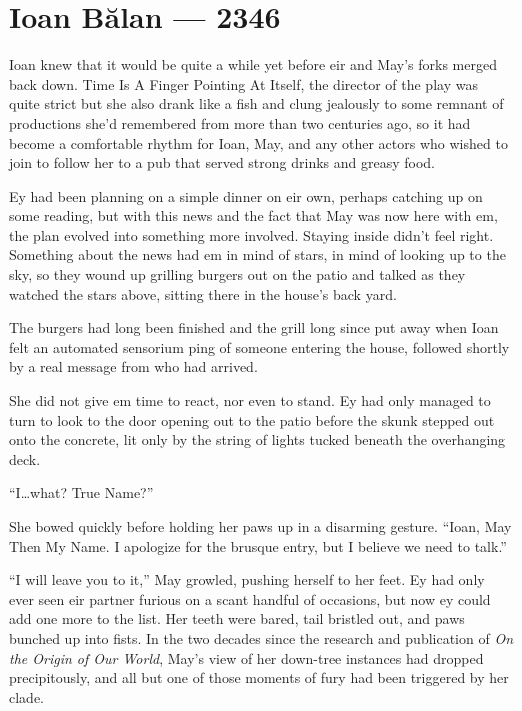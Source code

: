 \hypertarget{ioan-bux103lan-2346}{%
\chapter{Ioan Bălan — 2346}\label{ioan-bux103lan-2346}}

Ioan knew that it would be quite a while yet before eir and May's forks merged back down. Time Is A Finger Pointing At Itself, the director of the play was quite strict but she also drank like a fish and clung jealously to some remnant of productions she'd remembered from more than two centuries ago, so it had become a comfortable rhythm for Ioan, May, and any other actors who wished to join to follow her to a pub that served strong drinks and greasy food.

Ey had been planning on a simple dinner on eir own, perhaps catching up on some reading, but with this news and the fact that May was now here with em, the plan evolved into something more involved. Staying inside didn't feel right. Something about the news had em in mind of stars, in mind of looking up to the sky, so they wound up grilling burgers out on the patio and talked as they watched the stars above, sitting there in the house's back yard.

The burgers had long been finished and the grill long since put away when Ioan felt an automated sensorium ping of someone entering the house, followed shortly by a real message from who had arrived.

She did not give em time to react, nor even to stand. Ey had only managed to turn to look to the door opening out to the patio before the skunk stepped out onto the concrete, lit only by the string of lights tucked beneath the overhanging deck.

``I\ldots what? True Name?''

She bowed quickly before holding her paws up in a disarming gesture. ``Ioan, May Then My Name. I apologize for the brusque entry, but I believe we need to talk.''

``I will leave you to it,'' May growled, pushing herself to her feet. Ey had only ever seen eir partner furious on a scant handful of occasions, but now ey could add one more to the list. Her teeth were bared, tail bristled out, and paws bunched up into fists. In the two decades since the research and publication of \emph{On the Origin of Our World}, May's view of her down-tree instances had dropped precipitously, and all but one of those moments of fury had been triggered by her clade.

